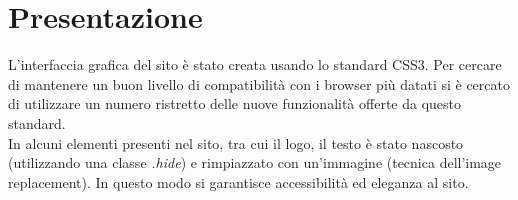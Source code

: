 \section{Presentazione}
L'interfaccia grafica del sito è stato creata usando lo standard CSS3.
Per cercare di mantenere un buon livello di compatibilità con i browser più
datati si è cercato di utilizzare un numero ristretto delle nuove funzionalità offerte da
questo standard.\\
In alcuni elementi presenti nel sito, tra cui il logo, il testo è stato nascosto (utilizzando una classe \textit{.hide}) e rimpiazzato con un'immagine (tecnica dell'image replacement).
In questo modo si garantisce accessibilità ed eleganza al sito.


\newpage